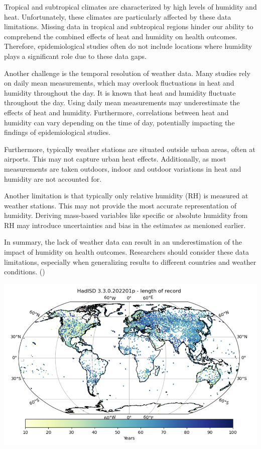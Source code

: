 \documentclass[
]{krantz}
\begin{document}
Tropical and subtropical climates are characterized by high levels of humidity and heat. Unfortunately, these climates are particularly affected by these data limitations. Missing data in tropical and subtropical regions hinder our ability to comprehend the combined effects of heat and humidity on health outcomes. Therefore, epidemiological studies often do not include locations where humidity plays a significant role due to these data gaps.

Another challenge is the temporal resolution of weather data. Many studies rely on daily mean measurements, which may overlook fluctuations in heat and humidity throughout the day. It is known that heat and humidity fluctuate throughout the day. Using daily mean measurements may underestimate the effects of heat and humidity. Furthermore, correlations between heat and humidity can vary depending on the time of day, potentially impacting the findings of epidemiological studies.

Furthermore, typically weather stations are situated outside urban areas, often at airports. This may not capture urban heat effects. Additionally, as most measurements are taken outdoors, indoor and outdoor variations in heat and humidity are not accounted for.

Another limitation is that typically only relative humidity (RH) is measured at weather stations. This may not provide the most accurate representation of humidity. Deriving mass-based variables like specific or absolute humidity from RH may introduce uncertainties and bias in the estimates as menioned earlier.

In summary, the lack of weather data can result in an underestimation of the impact of humidity on health outcomes. Researchers should consider these data limitations, especially when generalizing results to different countries and weather conditions. (\citet{baldwin2023})

\begin{center}\includegraphics[width=0.8\linewidth]{hadisdimage1} \end{center}
\end{document}
